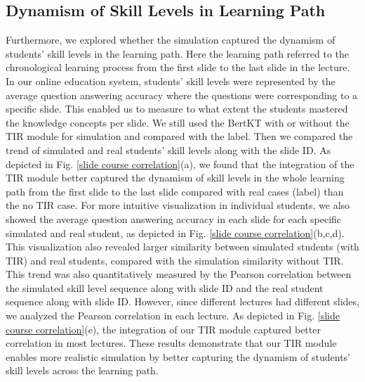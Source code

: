 \subsection{Dynamism of Skill Levels in Learning Path}
\label{subsec: dynamism}
Furthermore, we explored whether the simulation captured the dynamism of students' skill levels in the learning path. Here the learning path referred to the chronological learning process from the first slide to the last slide in the lecture. 
In our online education system, students' skill levels were represented by the average question answering accuracy where the questions were corresponding to a specific slide. This enabled us to measure to what extent the students mastered the knowledge concepts per slide.         
We still used the BertKT with or without the TIR module for simulation and compared with the label. Then we compared the trend of simulated and real students' skill levels along with the slide ID. 
As depicted in Fig. \ref{slide course correlation}(a), we found that the integration of the TIR module better captured the dynamism of skill levels in the whole learning path from the first slide to the last slide compared with real cases (label) than the no TIR case.
For more intuitive visualization in individual students, we also showed the average question answering accuracy in each slide for each specific simulated and real student, as depicted in Fig. \ref{slide course correlation}(b,c,d). This visualization also revealed larger similarity between simulated students (with TIR) and real students, compared with the simulation similarity without TIR.
This trend was also quantitatively measured by the Pearson correlation between the simulated skill level sequence along with slide ID and the real student sequence along with slide ID. However, since different lectures had different slides, we analyzed the Pearson correlation in each lecture. As depicted in Fig. \ref{slide course correlation}(e), the integration of our TIR module captured better correlation in most lectures.
These results demonstrate that our TIR module enables more realistic simulation by better capturing the dynamism of students' skill levels across the learning path.

